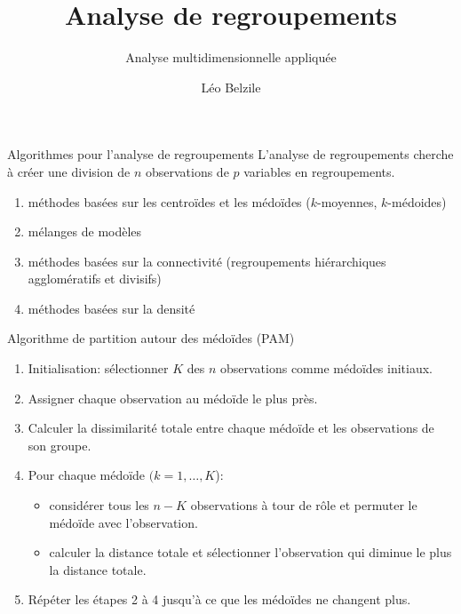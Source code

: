 \documentclass[
  ignorenonframetext,
]{beamer}
\title{Analyse de regroupements}
\subtitle{Analyse multidimensionnelle appliquée}
\author{Léo Belzile}
\date{}
\institute{HEC Montréal}
\providecommand{\tightlist}{%
  \setlength{\itemsep}{0pt}\setlength{\parskip}{0pt}}\usepackage{longtable,booktabs,array}
\begin{document}
\frame{\titlepage}
\ifdefined\Shaded\renewenvironment{Shaded}{\begin{tcolorbox}[boxrule=0pt, frame hidden, enhanced, breakable, interior hidden, sharp corners, borderline west={3pt}{0pt}{shadecolor}]}{\end{tcolorbox}}\fi

\begin{frame}{Algorithmes pour l'analyse de regroupements}
\protect\hypertarget{algorithmes-pour-lanalyse-de-regroupements}{}
L'analyse de regroupements cherche à créer une division de \(n\)
observations de \(p\) variables en regroupements.

\begin{enumerate}
\tightlist
\item
  méthodes basées sur les centroïdes et les médoïdes (\(k\)-moyennes,
  \(k\)-médoides)
\item
  mélanges de modèles
\item
  méthodes basées sur la connectivité (regroupements hiérarchiques
  agglomératifs et divisifs)
\item
  méthodes basées sur la densité
\end{enumerate}
\end{frame}

\begin{frame}{Algorithme de partition autour des médoïdes (PAM)}
\protect\hypertarget{algorithme-de-partition-autour-des-muxe9douxefdes-pam}{}
\begin{enumerate}
\tightlist
\item
  Initialisation: sélectionner \(K\) des \(n\) observations comme
  médoïdes initiaux.
\item
  Assigner chaque observation au médoïde le plus près.
\item
  Calculer la dissimilarité totale entre chaque médoïde et les
  observations de son groupe.
\item
  Pour chaque médoïde \((k=1, \ldots, K\)):

  \begin{itemize}
  \tightlist
  \item
    considérer tous les \(n-K\) observations à tour de rôle et permuter
    le médoïde avec l'observation.\\
  \item
    calculer la distance totale et sélectionner l'observation qui
    diminue le plus la distance totale.
  \end{itemize}
\item
  Répéter les étapes 2 à 4 jusqu'à ce que les médoïdes ne changent plus.
\end{enumerate}
\end{frame}
\end{document}
